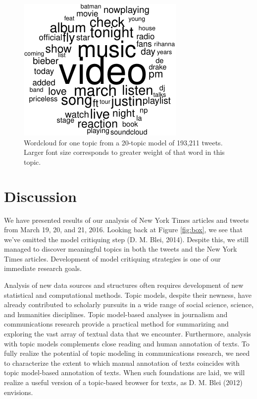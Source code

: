 \documentclass[12pt,]{article}
\begin{document}
\begin{figure}
\includegraphics[width=\textwidth]{lda-tutorial-2016_files/figure-latex/tw-wordcloud1-4.pdf}
\caption{Wordcloud for one topic from a 20-topic model of 193,211 tweets. Larger font size corresponds to greater weight of that word in this topic.\label{fig:twc4}}
\end{figure}

\section{Discussion}\label{discussion}

We have presented results of our analysis of New York Times articles and
tweets from March 19, 20, and 21, 2016. Looking back at Figure
\ref{fig:box}, we see that we've omitted the model critiquing step (D.
M. Blei, 2014). Despite this, we still managed to discover meaningful
topics in both the tweets and the New York Times articles. Development
of model critiquing strategies is one of our immediate research goals.

Analysis of new data sources and structures often requires development
of new statistical and computational methods. Topic models, despite
their newness, have already contributed to scholarly pursuits in a wide
range of social science, science, and humanities disciplines. Topic
model-based analyses in journalism and communications research provide a
practical method for summarizing and exploring the vast array of textual
data that we encounter. Furthermore, analysis with topic models
complements close reading and human annotation of texts. To fully
realize the potential of topic modeling in communications research, we
need to characterize the extent to which manual annotation of texts
coincides with topic model-based annotation of texts. When such
foundations are laid, we will realize a useful version of a topic-based
browser for texts, as D. M. Blei (2012) envisions.
\end{document}
